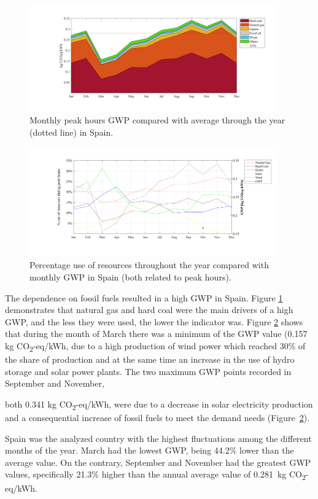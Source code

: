 {{\begin{figure}[]
	\centering
	\includegraphics[width=0.95\textwidth]{ChapterLCA/Images/GWP_plots/Spain_GWP.png}
	\vspace*{-7mm}
	\caption{Monthly peak hours GWP compared with average through the year (dotted line) in Spain.}
	\label{GWP_ES}
\end{figure}
	\vspace*{-7mm}
\begin{figure}[]
	\centering
	\hspace*{0.3cm}\includegraphics[width=0.95\textwidth]{ChapterLCA/Images/GWP_plots/Comp_GWP_ES.png}
	\vspace*{-10mm}
	\caption{Percentage use of resources throughout the year compared with monthly GWP in Spain (both related to peak hours).}
	\label{COMP_ES}
\end{figure}

The dependence on  fossil fuels resulted in a high GWP in Spain. Figure \ref{GWP_ES} demonstrates that natural gas and hard coal were the main drivers of a high GWP, and the less they were used, the lower the indicator was. Figure \ref{COMP_ES} shows that during the month of March there was a minimum of the GWP value {(0.157 kg CO\textsubscript2-eq/kWh}, due to a high production of wind power which reached 30\% of the share of production and at the same time an increase in the use of hydro storage and solar power plants. The two maximum GWP points recorded in September and November, {both  0.341 kg CO\textsubscript2-eq/kWh, were due to a decrease in solar electricity production and a consequential increase of fossil fuels to meet the demand needs (Figure~\ref{COMP_ES}). {Spain was the analyzed country with the highest fluctuations among the different months of the year. March had the lowest GWP, being 44.2\% lower than the average value. On the contrary, September and November had the greatest GWP values, specifically 21.3\% higher than the annual average value of 0.281~kg CO\textsubscript2-eq/kWh.


}}}}
